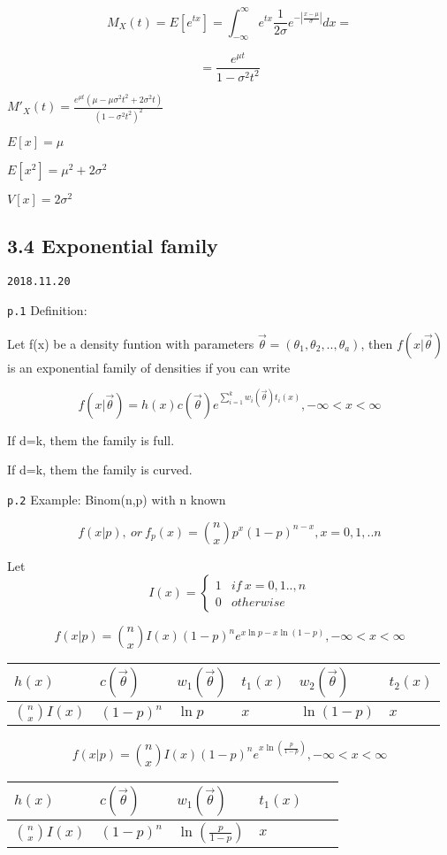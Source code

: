 \documentclass[]{tufte-book}
\begin{document}
\[M_X(t)=E[e^{tx}]=\int_{-\infty}^{\infty}e^{tx}\frac{1}{2\sigma} e^{-|\frac{x-\mu}{\sigma}|}dx=\]

\[=\frac{e^{\mu t}}{1-\sigma^2t^2}\]

\(M'_X(t)=\frac{e^{\mu t}(\mu-\mu\sigma^2t^2+2\sigma^2t)}{(1-\sigma^2t^2)^2}\)

\(E[x]=\mu\)

\(E[x^2]=\mu^2+2\sigma^2\)

\(V[x]=2\sigma^2\)

\hypertarget{exponential-family}{%
\subsection{3.4 Exponential family}\label{exponential-family}}

\texttt{2018.11.20}

\texttt{p.1} Definition:

Let f(x) be a density funtion with parameters
\(\vec\theta=(\theta_1,\theta_2,..,\theta_a)\), then \(f(x|\vec\theta)\)
is an exponential family of densities if you can write

\[f(x|\vec\theta)=h(x)c(\vec\theta)e^{\sum_{i=1}^kw_i(\vec\theta)t_i(x)}, -\infty<x<\infty\]

If d=k, them the family is full.

If d=k, them the family is curved.

\texttt{p.2} Example: Binom(n,p) with n known

\[f(x|p),\ or\ f_p(x)=\binom{n}xp^x(1-p)^{n-x}, x=0,1,..n\]

Let \[I(x)=\begin{cases}1 & if\ x=0,1..,n\\ 0 & otherwise \end{cases}\]

\[f(x|p)=\binom{n}xI(x)(1-p)^ne^{x\ln{p}-x\ln(1-p)}, -\infty<x<\infty\]

\begin{longtable}[]{@{}llllll@{}}
\toprule
\(h(x)\) & \(c(\vec\theta)\) & \(w_1(\vec\theta)\) & \(t_1(x)\) &
\(w_2(\vec\theta)\) & \(t_2(x)\)\tabularnewline
\midrule
\endhead
\(\binom{n}xI(x)\) & \((1-p)^n\) & \(\ln{p}\) & \(x\) & \(\ln(1-p)\) &
\(x\)\tabularnewline
\bottomrule
\end{longtable}

\[f(x|p)=\binom{n}xI(x)(1-p)^ne^{x\ln(\frac{p}{1-p})}, -\infty<x<\infty\]

\begin{longtable}[]{@{}llllll@{}}
\toprule
\(h(x)\) & \(c(\vec\theta)\) & \(w_1(\vec\theta)\) & \(t_1(x)\) &
&\tabularnewline
\midrule
\endhead
\(\binom{n}xI(x)\) & \((1-p)^n\) & \(\ln(\frac{p}{1-p})\) & \(x\) &
&\tabularnewline
\bottomrule
\end{longtable}
\end{document}
